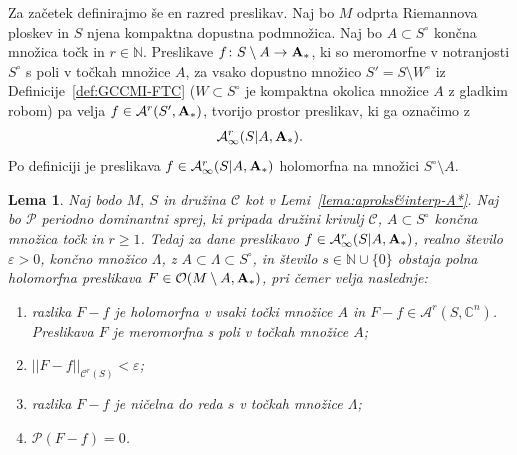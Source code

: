 \documentclass[12pt,a4paper,twoside]{article}
\theoremstyle{definition} %
\theoremstyle{plain} %
\newtheorem{lema}[definicija]{Lema}
\numberwithin{equation}{section}  %
\newcommand{\N}{\mathbb N}
\begin{document}
Za začetek definirajmo še en razred preslikav.
Naj bo $M$ odprta Riemannova ploskev in $S$ njena kompaktna dopustna podmnožica. Naj bo $A \subset S^{\circ}$ končna množica točk in $r \in \N$.
Preslikave $f \colon S \setminus A \to \textup{\textbf{A}}_{*}$, ki so meromorfne v notranjosti $S^{\circ}$ s poli v točkah množice $A$, za vsako dopustno množico $S' = S \setminus W^{\circ}$ iz Definicije~\ref{def:GCCMI-FTC} ($W \subset S^{\circ}$ je kompaktna okolica množice $A$ z gladkim robom) pa velja $f \in \mathcal{A}^{r}(S', \textup{\textbf{A}}_{*})$, tvorijo prostor preslikav, ki ga označimo z 
\begin{gather*}
\mathcal{A}_{\infty}^{r}(S|A, \textup{\textbf{A}}_{*}).
\end{gather*}
Po definiciji je preslikava $f \in \mathcal{A}_{\infty}^{r}(S|A, \textup{\textbf{A}}_{*})$ holomorfna na množici $S^{\circ} \setminus A$.

\begin{lema} \label{lema:ML-pomozna-lema}
Naj bodo $M, \ S$ in družina $\mathcal{C}$ kot v Lemi~\ref{lema:aproks&interp-A*}. Naj bo $\mathcal{P}$ periodno dominantni sprej, ki pripada družini krivulj $\mathcal{C}$, $A \subset S^{\circ}$ končna množica točk in $r \geq 1$.
Tedaj za dane preslikavo $f \in \mathcal{A}_{\infty}^{r}(S|A, \textup{\textbf{A}}_{*})$, realno število $\varepsilon > 0$, končno množico $\Lambda$, z $A \subset \Lambda \subset S^{\circ}$, in število $s \in \mathbb{N} \cup \{0\}$ obstaja polna holomorfna preslikava $F \in \mathcal{O}(M \setminus A, \textup{\textbf{A}}_{*})$, pri čemer velja naslednje:
\begin{enumerate}
\item razlika $F-f$ je holomorfna v vsaki točki množice $A$ in $F-f \in \mathcal{A}^{r}(S, \mathbb{C}^{n})$. Preslikava $F$ je meromorfna s poli v točkah množice $A$;
\item $ ||F-f||_{\mathcal{C}^{r}(S)} < \varepsilon$;
\item razlika $F-f$ je ničelna do reda $s$ v točkah množice $\Lambda$;
\item $\mathcal{P}(F-f) = 0$.
\end{enumerate}
\end{lema}
\end{document}

